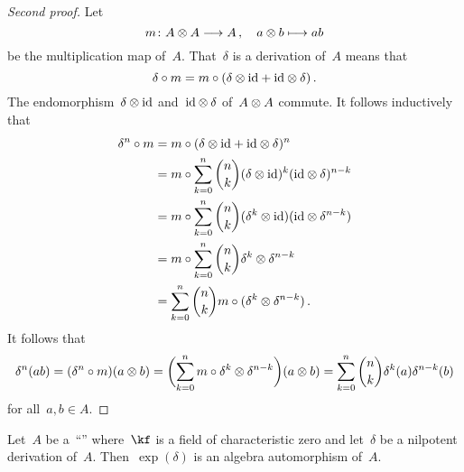 \begin{proof}[Second proof]
	Let
	\[
		m
		\colon
		A \tensor A
		\to
		A \,,
		\quad
		a \tensor b
		\mapsto
		ab
	\]
	be the multiplication map of~$A$.
	That~$\delta$ is a derivation of~$A$ means that
	\[
		\delta \circ m
		=
		m \circ (\delta \otimes \mathrm{id} + \mathrm{id} \otimes \delta) \,.
	\]
	The endomorphism~$\delta \otimes \mathrm{id}$ and~$\mathrm{id} \otimes \delta$ of~$A \otimes A$ commute.
	It follows inductively that
	\begin{align*}
		\delta^n \circ m
		&=
		m \circ (\delta \otimes \mathrm{id} + \mathrm{id} \otimes \delta)^n
		\\
		&=
		m \circ \sum_{k=0}^n \binom{n}{k} (\delta \otimes \mathrm{id})^k (\mathrm{id} \otimes \delta)^{n-k}
		\\
		&=
		m \circ \sum_{k=0}^n \binom{n}{k} (\delta^k \otimes \mathrm{id}) (\mathrm{id} \otimes \delta^{n-k})
		\\
		&=
		m \circ \sum_{k=0}^n \binom{n}{k} \delta^k \otimes \delta^{n-k}
		\\
		&=
		\sum_{k=0}^n \binom{n}{k} m \circ (\delta^k \otimes \delta^{n-k}) \,.
	\end{align*}
	It follows that
	\[
		\delta^n( ab )
		=
		(\delta^n \circ m)(a \otimes b)
		=
		\biggl( \sum_{k=0}^n m \circ \delta^k \otimes \delta^{n-k} \biggr)(a \otimes b)
		=
		\sum_{k=0}^n \binom{n}{k} \delta^k(a) \delta^{n-k}(b)
	\]
	for all~$a, b \in A$.
\end{proof}


\begin{proposition}
	\label{exponential of derivation is automorphism}
	Let~$A$ be a~\enquote{\algebra{$\kf$}} where~$\kf$ is a field of characteristic zero and let~$\delta$ be a nilpotent derivation of~$A$.
	Then~$\exp(\delta)$ is an algebra automorphism of~$A$.
\end{proposition}


